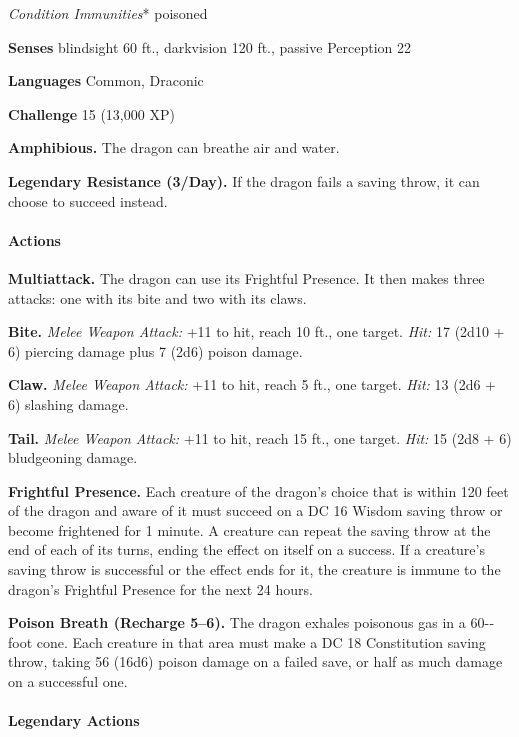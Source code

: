 \documentclass[
]{article}
\begin{document}
\emph{Condition Immunities}* poisoned

\textbf{Senses} blindsight 60 ft., darkvision 120 ft., passive
Perception 22

\textbf{Languages} Common, Draconic

\textbf{Challenge} 15 (13,000 XP)

\textbf{Amphibious.} The dragon can breathe air and water.

\textbf{Legendary Resistance (3/Day).} If the dragon fails a saving
throw, it can choose to succeed instead.

\hypertarget{actions-32}{%
\paragraph{Actions}\label{actions-32}}

\textbf{Multiattack.} The dragon can use its Frightful Presence. It then
makes three attacks: one with its bite and two with its claws.

\textbf{Bite.} \emph{Melee Weapon Attack:} +11 to hit, reach 10 ft., one
target. \emph{Hit:} 17 (2d10 + 6) piercing damage plus 7 (2d6) poison
damage.

\textbf{Claw.} \emph{Melee Weapon Attack:} +11 to hit, reach 5 ft., one
target. \emph{Hit:} 13 (2d6 + 6) slashing damage.

\textbf{Tail.} \emph{Melee Weapon Attack:} +11 to hit, reach 15 ft., one
target. \emph{Hit:} 15 (2d8 + 6) bludgeoning damage.

\textbf{Frightful Presence.} Each creature of the dragon's choice that
is within 120 feet of the dragon and aware of it must succeed on a DC 16
Wisdom saving throw or become frightened for 1 minute. A creature can
repeat the saving throw at the end of each of its turns, ending the
effect on itself on a success. If a creature's saving throw is
successful or the effect ends for it, the creature is immune to the
dragon's Frightful Presence for the next 24 hours.

\textbf{Poison Breath (Recharge 5--6).} The dragon exhales poisonous gas
in a 60-­‐foot cone. Each creature in that area must make a DC 18
Constitution saving throw, taking 56 (16d6) poison damage on a failed
save, or half as much damage on a successful one.

\hypertarget{legendary-actions-5}{%
\paragraph{Legendary Actions}\label{legendary-actions-5}}
\end{document}
